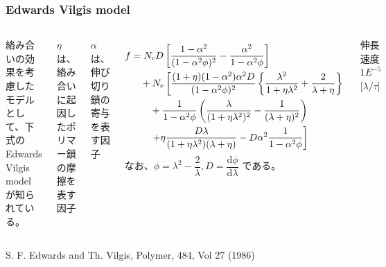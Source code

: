 \documentclass[11pt, dvipdfmx]{beamer}
\newcommand{\diff}{\mathrm d}
\begin{document}
\begin{frame}
\frametitle{Edwards Vilgis model}

\begin{columns}[totalwidth=1\textwidth]

\tiny
絡み合いの効果を考慮したモデルとして、下式の Edwards Vilgis model が知られている。

$\eta$ は、絡み合いに起因したポリマー鎖の摩擦を表す因子

$\alpha$ は、伸び切り鎖の寄与を表す因子

\begin{align*}
f
	&= N_c D \left[ \dfrac{1-\alpha^2}{(1-\alpha^2 \phi)^2} - \dfrac{\alpha^2}{1-\alpha^2 \phi} \right]\notag \\
	&\quad + N_e \left[
			\dfrac{(1+\eta)(1-\alpha^2)\alpha^2D}{(1-\alpha^2 \phi)^2} \left\{ \dfrac{\lambda^2}{1+\eta \lambda^2}
				+\dfrac{2}{\lambda+\eta} \right\} \right. \notag \\
			&\quad\quad + \dfrac{1}{1-\alpha^2\phi} \left( \dfrac{\lambda}{(1+\eta \lambda^2)^2} -\dfrac{1}{(\lambda+\eta)^2} \right) \notag \\
			&\quad\quad \left. + \eta \dfrac{D \lambda}{(1+\eta\lambda^2)(\lambda + \eta)} -D\alpha^2\dfrac{1}{1-\alpha^2\phi}
		\right]
\end{align*}
なお、$\phi=\lambda^2-\dfrac{2}{\lambda}, D=\dfrac{\diff \phi}{\diff \lambda}$ である。

\begin{center}
伸長速度 $1E^{-5}$ [$\lambda/\tau$]
\end{center}
\vspace{-3mm}
\includegraphics[width=\columnwidth]{./fig/E_V.pdf}
\end{columns}
\vspace{3mm}
\footnotesize
S. F. Edwards and Th. Vilgis, Polymer, 484, Vol 27 (1986)
\end{frame}
\end{document}
